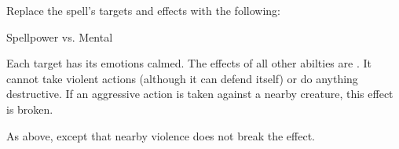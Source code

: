 Replace the spell's targets and effects with the following:
\begin{spellcontent}

\begin{augmenttargetinginfo}




\end{augmenttargetinginfo}


\begin{augmenteffects}




\begin{spellattack}{Spellpower vs. Mental}


\spellsuccess
Each target has its emotions calmed.
The effects of all other  abilties are .
It cannot take violent actions (although it can defend itself) or do anything destructive.
If an aggressive action is taken against a nearby creature, this effect is broken.



\spellcritical
As above, except that nearby violence does not break the effect.



\end{spellattack}





\end{augmenteffects}

\end{spellcontent}








